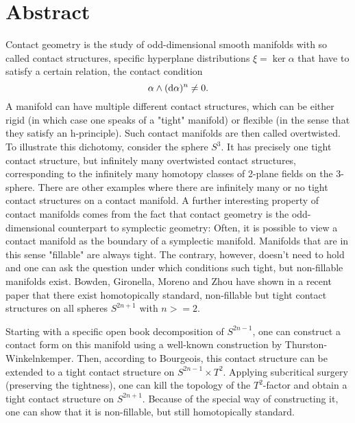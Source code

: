 \section*{Abstract}
Contact geometry is the study of odd-dimensional smooth manifolds with so called contact structures, specific hyperplane distributions $\xi = \ker \alpha$ that have to satisfy a certain relation, the contact condition
\[
    \alpha \wedge (\mathrm{d} \alpha)^n \neq 0.
\]
A manifold can have multiple different contact structures, which can be either rigid (in which case one speaks of a "tight" manifold) or flexible (in the sense that they satisfy an h-principle). Such contact manifolds are then called overtwisted.
To illustrate this dichotomy, consider the sphere $S^3$. It has precisely one tight contact structure, but infinitely many overtwisted contact structures, corresponding to the infinitely many homotopy classes of 2-plane fields on the 3-sphere. There are other examples where there are infinitely many or no tight contact structures on a contact manifold.
A further interesting property of contact manifolds comes from the fact that contact geometry is the odd-dimensional counterpart to symplectic geometry: Often, it is possible to view a contact manifold as the boundary of a symplectic manifold. Manifolds that are in this sense "fillable" are always tight. The contrary, however, doesn't need to hold and one can ask the question under which conditions such tight, but non-fillable manifolds exist.
Bowden, Gironella, Moreno and Zhou have shown in a recent paper that there exist homotopically standard, non-fillable but tight contact structures on all spheres $S^{2n+1}$ with $n >= 2$.

Starting with a specific open book decomposition of $S^{2n-1}$, one can construct a contact form on this manifold using a well-known construction by Thurston-Winkelnkemper. Then, according to Bourgeois, this contact structure can be extended to a tight contact structure on $S^{2n-1}\times T^2$.
Applying subcritical surgery (preserving the tightness), one can kill the topology of the $T^2$-factor and obtain a tight contact structure on $S^{2n+1}$. Because of the special way of constructing it, one can show that it is non-fillable, but still homotopically standard.